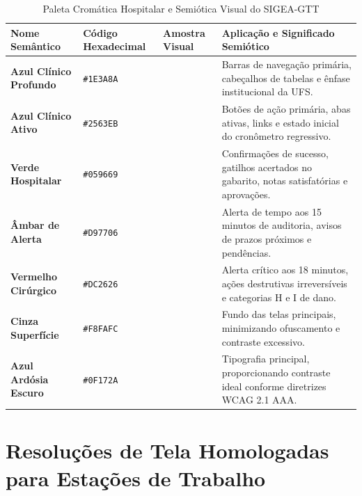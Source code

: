 \begin{table}[!ht]
\centering
\caption{Paleta Cromática Hospitalar e Semiótica Visual do SIGEA-GTT}
\label{tab_paleta_cores_sigea}
\footnotesize
\begin{tabularx}{\textwidth}{p{3.2cm} p{2.4cm} p{2.2cm} X}
\toprule
\textbf{Nome Semântico} & \textbf{Código Hexadecimal} & \textbf{Amostra Visual} & \textbf{Aplicação e Significado Semiótico} \\
\midrule
\textbf{Azul Clínico Profundo} & \texttt{\#1E3A8A} & \cellcolor{clinical-700}\phantom{XXXX} & Barras de navegação primária, cabeçalhos de tabelas e ênfase institucional da UFS. \\
\addlinespace
\textbf{Azul Clínico Ativo} & \texttt{\#2563EB} & \cellcolor{clinical-500}\phantom{XXXX} & Botões de ação primária, abas ativas, links e estado inicial do cronômetro regressivo. \\
\addlinespace
\textbf{Verde Hospitalar} & \texttt{\#059669} & \cellcolor{hospital-green}\phantom{XXXX} & Confirmações de sucesso, gatilhos acertados no gabarito, notas satisfatórias e aprovações. \\
\addlinespace
\textbf{Âmbar de Alerta} & \texttt{\#D97706} & \cellcolor{alert-amber}\phantom{XXXX} & Alerta de tempo aos 15 minutos de auditoria, avisos de prazos próximos e pendências. \\
\addlinespace
\textbf{Vermelho Cirúrgico} & \texttt{\#DC2626} & \cellcolor{danger-red}\phantom{XXXX} & Alerta crítico aos 18 minutos, ações destrutivas irreversíveis e categorias H e I de dano. \\
\addlinespace
\textbf{Cinza Superfície} & \texttt{\#F8FAFC} & \cellcolor{clinical-100!40}\phantom{XXXX} & Fundo das telas principais, minimizando ofuscamento e contraste excessivo. \\
\addlinespace
\textbf{Azul Ardósia Escuro} & \texttt{\#0F172A} & \cellcolor{clinical-900}\textcolor{white}{\phantom{XXXX}} & Tipografia principal, proporcionando contraste ideal conforme diretrizes WCAG 2.1 AAA. \\
\bottomrule
\end{tabularx}
\end{table}

\section{Resoluções de Tela Homologadas para Estações de Trabalho}
\label{sec_resolucoes_homologadas}

